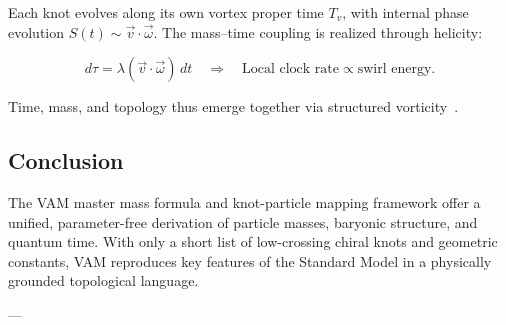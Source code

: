 Each knot evolves along its own vortex proper time $T_v$, with internal phase evolution \( S(t) \sim \vec{v} \cdot \vec{\omega} \). The mass–time coupling is realized through helicity:

\[
d\tau = \lambda (\vec{v} \cdot \vec{\omega}) \, dt
\quad \Rightarrow \quad
\text{Local clock rate} \propto \text{swirl energy}.
\]

Time, mass, and topology thus emerge together via structured vorticity~\cite{Iskandarani2025Timedilation, Iskandarani2025AppendixNow}.

\subsection*{Conclusion}

The VAM master mass formula and knot-particle mapping framework offer a unified, parameter-free derivation of particle masses, baryonic structure, and quantum time. With only a short list of low-crossing chiral knots and geometric constants, VAM reproduces key features of the Standard Model in a physically grounded topological language.

---




